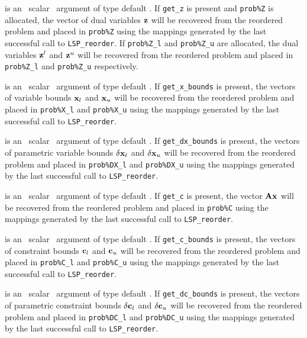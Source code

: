 \documentclass{galahad}
\newcommand{\packagename}{LSP}
\begin{document}
\begin{description}
is an \optional\ scalar \intentin\ argument of type default \logical. 
If {\tt get\_z} is present and {\tt prob\%Z} is allocated, 
the vector of dual variables ${\mathbf{z}}$
will be recovered from  the reordered problem and placed in {\tt prob\%Z} 
using the mappings generated by the last successful call to 
{\tt \packagename\_reorder}. If {\tt prob\%Z\_l} and {\tt prob\%Z\_u} 
are allocated, the dual variables
${\mathbf{z}}^l$ and ${\mathbf{z}}^u$ will be recovered from  the reordered problem and 
placed in {\tt prob\%Z\_l} and {\tt prob\%Z\_u} respectively.
 
is an \optional\ scalar \intentin\ argument of type default \logical. 
If {\tt get\_x\_bounds} is present, 
the vectors of variable bounds ${\mathbf{x}}_l$ and ${\mathbf{x}}_u$
will be recovered from  the reordered problem and placed in {\tt prob\%X\_l} 
and {\tt prob\%X\_u} using the mappings generated by the last successful 
call to {\tt \packagename\_reorder}. 
 
is an \optional\ scalar \intentin\ argument of type default \logical. 
If {\tt get\_dx\_bounds} is present, 
the vectors of parametric variable bounds $\delta {\mathbf{x}}_l$ and 
$\delta {\mathbf{x}}_u$
will be recovered from  the reordered problem and placed in {\tt prob\%DX\_l} 
and {\tt prob\%DX\_u} using the mappings generated by the last successful 
call to {\tt \packagename\_reorder}. 

is an \optional\ scalar \intentin\ argument of type default \logical. 
If {\tt get\_c} is present, the vector ${\mathbf{A}} {\mathbf{x}}$ 
will be recovered from  the reordered problem and placed in {\tt prob\%C} 
using the mappings generated by the last successful call to 
{\tt \packagename\_reorder}. 
 
is an \optional\ scalar \intentin\ argument of type default \logical. 
If {\tt get\_c\_bounds} is present, 
the vectors of constraint bounds ${\mathbf{c}}_l$ and 
${\mathbf{c}}_u$
will be recovered from  the reordered problem and placed in {\tt prob\%C\_l} 
and {\tt prob\%C\_u} using the mappings generated by the last successful 
call to {\tt \packagename\_reorder}. 
 
is an \optional\ scalar \intentin\ argument of type default \logical. 
If {\tt get\_dc\_bounds} is present, 
the vectors of parametric constraint bounds $\delta {\mathbf{c}}_l$ and $\delta {\mathbf{c}}_u$
will be recovered from  the reordered problem and placed in {\tt prob\%DC\_l} 
and {\tt prob\%DC\_u} using the mappings generated by the last successful 
call to {\tt \packagename\_reorder}. 
 

\end{description}
\end{document}
